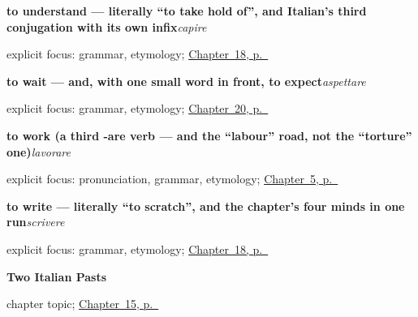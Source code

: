 \noindent\begin{minipage}[t]{\linewidth}
\raggedright
\textbf{to understand — literally \textquotedblleft{}to take hold of\textquotedblright{}, and Italian's third conjugation with its own infix}\enspace\emph{capire}\par
\footnotesize explicit focus: grammar, etymology; \hyperref[ch:it-mind-verbs]{Chapter~18, p.~\pageref*{ch:it-mind-verbs}}
\end{minipage}\par\smallskip

\noindent\begin{minipage}[t]{\linewidth}
\raggedright
\textbf{to wait — and, with one small word in front, to expect}\enspace\emph{aspettare}\par
\footnotesize explicit focus: grammar, etymology; \hyperref[ch:it-carry-buy-wait-meet]{Chapter~20, p.~\pageref*{ch:it-carry-buy-wait-meet}}
\end{minipage}\par\smallskip

\noindent\begin{minipage}[t]{\linewidth}
\raggedright
\textbf{to work (a third -are verb — and the \textquotedblleft{}labour\textquotedblright{} road, not the \textquotedblleft{}torture\textquotedblright{} one)}\enspace\emph{lavorare}\par
\footnotesize explicit focus: pronunciation, grammar, etymology; \hyperref[ch:it-first-verbs]{Chapter~5, p.~\pageref*{ch:it-first-verbs}}
\end{minipage}\par\smallskip

\noindent\begin{minipage}[t]{\linewidth}
\raggedright
\textbf{to write — literally \textquotedblleft{}to scratch\textquotedblright{}, and the chapter's four minds in one run}\enspace\emph{scrivere}\par
\footnotesize explicit focus: grammar, etymology; \hyperref[ch:it-mind-verbs]{Chapter~18, p.~\pageref*{ch:it-mind-verbs}}
\end{minipage}\par\smallskip

\noindent\begin{minipage}[t]{\linewidth}
\raggedright
\textbf{Two Italian Pasts}\par
\footnotesize chapter topic; \hyperref[ch:it-two-pasts]{Chapter~15, p.~\pageref*{ch:it-two-pasts}}
\end{minipage}\par\smallskip

